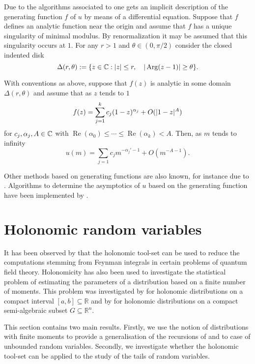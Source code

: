     Due to the algorithms associated to  one gets an implicit description of the generating function $f$ of $u$ by means of a differential equation.
    Suppose that $f$ defines an analytic function near the origin and assume that $f$ has a unique singularity of minimal modulus.
    By renormalization it may be assumed that this singularity occurs at $1$.
    For any $r>1$ and $\theta \in (0,\pi/2)$  consider the closed indented disk
    $$\Delta(r,\theta) := \{z\in \mathbb{C}: \vert z \vert\leq r, \quad \vert \operatorname{Arg}(z-1) \vert\geq \theta\}.$$
    \begin{theorem}{\cite[Corollary 3]{flajolet1990singularity}}
      With conventions as above, suppose that $f(z)$ is analytic in some domain $\Delta(r,\theta)$ and assume that as $z$ tends to $1$
      $$f(z) = \sum_{j=1}^k c_{j}(1-z)^{\alpha_j} + O(\vert 1-z \vert^A)$$
      for $c_j,\alpha_j,A\in \mathbb{C}$ with $\operatorname{Re}(\alpha_0)\leq \cdots \leq \operatorname{Re}(\alpha_k)<A$.
      Then, as $m$ tends to infinity
      $$u(m) = \sum_{j=1}c_j m^{-\alpha_j' - 1} + O(m^{-A -1}).$$
    \end{theorem}
    Other methods based on generating functions are also known, for instance due to \cite{hayman1956generalisation}.
    Algorithms to determine the asymptotics of $u$ based on the generating function have been implemented by \cite{salvy1991examples}.
\section{Holonomic random variables}\label{sec: HolonomicRV}
It has been observed by \cite{bitoun2019feynman} that the holonomic tool-set can be used to reduce the computations stemming from Feynman integrals in certain problems of quantum field theory.
Holonomicity has also been used to investigate the statistical problem of estimating the parameters of a distribution based on a finite number of moments.
This problem was investigated by \cite{batenkov2009moment} for holonomic distributions on a compact interval $[a,b]\subseteq \mathbb{R}$ and by \cite{brehard2019moment} for holonomic distributions on a compact semi-algebraic subset $G\subseteq \mathbb{R}^n$.

This section contains two main results.
Firstly, we use the notion of distributions with finite moments to provide a generalisation of the recursions of \cite{batenkov2009moment} and \cite{brehard2019moment} to case of unbounded random variables.
Secondly, we investigate whether the holonomic tool-set can be applied to the study of the tails of random variables.

